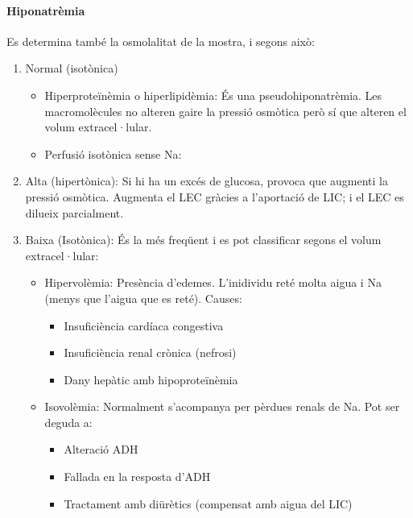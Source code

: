 \paragraph{Hiponatrèmia}
Es determina també la osmolalitat de la mostra, i segons això:
\begin{enumerate}
\item Normal (isotònica)
  \begin{itemize}
  \item Hiperproteïnèmia o hiperlipidèmia: És una
    pseudohiponatrèmia. Les macromolècules no alteren gaire la pressió
    osmòtica però sí que alteren el volum extracel·lular.

  \item Perfusió isotònica sense Na:
  \end{itemize}

\item Alta (hipertònica): Si hi ha un excés de glucosa, provoca que
  augmenti la pressió osmòtica. Augmenta el LEC gràcies a l'aportació
  de LIC; i el LEC es dilueix parcialment.

\item Baixa (Isotònica): És la més freqüent i es pot classificar
  segons el volum extracel·lular:
  \begin{itemize}
  \item Hipervolèmia: Presència d'edemes. L'inidividu reté molta aigua
    i Na (menys que l'aigua que es reté). Causes:
    \begin{itemize}
    \item Insuficiència cardíaca congestiva
    \item Insuficiència renal crònica (nefrosi)
    \item Dany hepàtic amb hipoproteïnèmia
    \end{itemize}

  \item Isovolèmia: Normalment s'acompanya per pèrdues renals de
    Na. Pot ser deguda a:
    \begin{itemize}
    \item Alteració ADH
    \item Fallada en la resposta d'ADH
    \item Tractament amb diürètics (compensat amb aigua del LIC)
    \end{itemize}


\end{itemize}
\end{enumerate}
